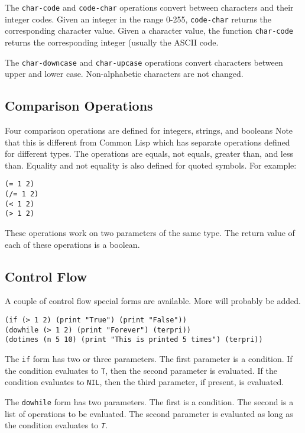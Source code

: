 \documentclass[10pt, openany]{book}
\newcommand{\function}[1]{\texttt{#1}}
\newcommand{\constant}[1]{\emph{\texttt{#1}}}
\newcommand{\cl}{Common Lisp}
\begin{document}
The \function{char-code} and \function{code-char} operations convert between characters and their integer codes.  Given an integer in the range 0-255, \function{code-char} returns the corresponding character value.  Given a character value, the function \function{char-code} returns the corresponding integer (usually the ASCII code.

The \function{char-downcase} and \function{char-upcase} operations convert characters between upper and lower case.  Non-alphabetic characters are not changed.

\subsection{Comparison Operations}
Four comparison operations are defined for integers, strings, and booleans  Note that this is different from \cl{} which has separate operations defined for different types.  The operations are equals, not equals, greater than, and less than.  Equality and not equality is also defined for quoted symbols.  For example:

\begin{lstlisting}
(= 1 2)
(/= 1 2)
(< 1 2)
(> 1 2)
\end{lstlisting}
These operations work on two parameters of the same type.  The return value of each of these operations is a boolean.

\subsection{Control Flow}
A couple of control flow special forms are available.  More will probably be added.

\begin{lstlisting}
(if (> 1 2) (print "True") (print "False"))
(dowhile (> 1 2) (print "Forever") (terpri))
(dotimes (n 5 10) (print "This is printed 5 times") (terpri))
\end{lstlisting}

The \function{if} form has two or three parameters.  The first parameter is a condition.  If the condition evaluates to \function{T}, then the second parameter is evaluated.  If the condition evaluates to \function{NIL}, then the third parameter, if present, is evaluated.

The \function{dowhile} form has two parameters.  The first is a condition.  The second is a list of operations to be evaluated.  The second parameter is evaluated as long as the condition evaluates to \constant{T}.
\end{document}
